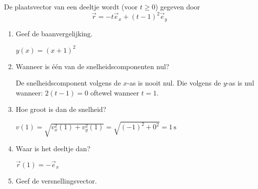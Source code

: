 



\item De plaatsvector van een deeltje wordt (voor $t\geq0$) gegeven door
\begin{equation*}
	\vec{r}=-t\vec{e}_x+(t-1)^2\vec{e}_y
\end{equation*}
\begin{enumerate}
\item Geef de baanvergelijking.

\begin{oplossing}
	$y(x)=(x+1)^2$
\end{oplossing}

\item Wanneer is \'e\'en van de snelheidscomponenten nul?

\begin{oplossing}
	De snelheidscomponent volgens de $x$-as is nooit nul. Die volgens de $y$-as is nul wanneer: $2(t-1)=0$ oftewel wanneer $t=1$.
\end{oplossing}

\item Hoe groot is dan de snelheid?

\begin{oplossing}
	$v(1)=\sqrt{v_x^2(1)+v_y^2(1)}=\sqrt{(-1)^2+0^2}=1\,\text{s}$
\end{oplossing}

\item Waar is het deeltje dan?

\begin{oplossing}
	$\vec{r}(1)=-\vec{e}_x$
\begin{center}
\end{center}
\end{oplossing}

\item Geef de versnellingsvector.


\end{enumerate}
